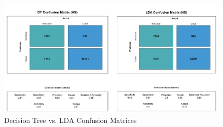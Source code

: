 \documentclass[12pt]{article}
\begin{document}
\begin{figure}[htp!]
\caption{Decision Tree vs. LDA Confusion Matrices}
\includegraphics[width=16cm]{Fig5.png}
\centering
\end{figure}
\end{document}
